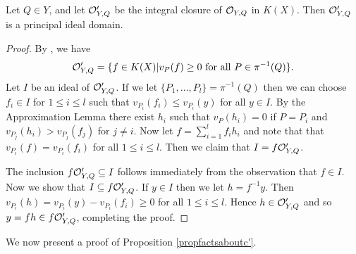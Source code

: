 
    \begin{lem}\label{lemmapidlemma}
    Let $Q\in Y$, and let ${\cal O}_{Y,Q}'$ be the integral closure of ${\cal O}_{Y,Q}$ in $K(X)$.
    Then ${\cal O}_{Y,Q}'$ is a principal ideal domain.
    \end{lem}
    \begin{proof}
    By \cite[Cor. 3.3.5]{stichtenoth}, we have 
        \[
        \cO_{Y,Q}' = \{f\in K(X)|v_P(f) \geq 0 \ \text{for all} \ P\in \pi^{-1}(Q)\}.
        \]  
    Let $I$ be an ideal of ${\cal O}_{Y,Q}'$.
    If we let $\{P_1,\ldots, P_l\} = \pi^{-1}(Q)$ then we can choose $f_i \in I$ for $1\leq i \leq l$ such that $v_{P_i}(f_i) \leq v_{P_i}(y)$ for all $y\in I$.
    By the Approximation Lemma there exist $h_i$ such that $v_P (h_i) = 0$ if $P=P_i$ and $v_{P_j}(h_i) > v_{P_j}(f_j)$ for $j\neq i$.
    Now let $f = \sum_{i=1}^l f_ih_i$ and note that that $v_{P_i}(f) = v_{P_i}(f_i)$ for all $1\leq i\leq l$.
    Then we claim that $I = f {\cal O}_{Y,Q}'$.


    The inclusion $f{\cal O}_{Y,Q}' \subseteq I$ follows immediately from the observation that $f \in I$.
    Now we show that $I \subseteq f{\cal O}_{Y,Q}'$.
    If $y\in I$ then we let $h = f^{-1}y$.
    Then $v_{P_i}(h) = v_{P_i}(y) - v_{P_i}(f_i) \geq 0$ for all $1\leq i\leq l$.
    Hence $h\in {\cal O}_{Y,Q}'$ and so $y = fh \in f{\cal O}_{Y,Q}'$, completing the proof.
    \end{proof}

We now present a proof of Proposition \ref{propfactsaboutc'}.

